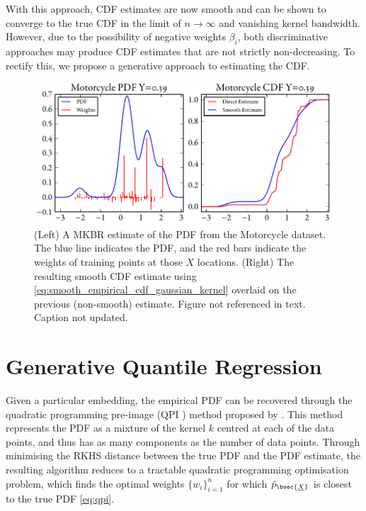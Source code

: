 \documentclass[twoside]{article} \usepackage{aistats2017}
\newcommand{\rv}[1]{\underline{#1}}
\newcommand{\warn}[1]{{\color{RedOrange} #1}}
\newcommand{\qpi}{QPI }
\begin{document}
		With this approach, CDF estimates are now smooth and can be shown to converge to the true CDF in the limit of $n \rightarrow \infty$ and vanishing kernel bandwidth. However, due to the possibility of negative weights $\beta_{i}$, both discriminative approaches may produce CDF estimates that are not strictly non-decreasing. To rectify this, we propose a generative approach to estimating the CDF.

		\begin{figure}
			\begin{center}
				\includegraphics[width=\columnwidth]{figures/cumulativeexamplesmooth}
			\end{center}
			\caption{\small (Left) A MKBR estimate of the PDF from the Motorcycle dataset. The blue line indicates the PDF, and the red bars indicate the weights of training points at those $X$ locations. (Right) The resulting smooth CDF estimate using \eqref{eq:smooth_empirical_cdf_gaussian_kernel} overlaid on the previous (non-smooth) estimate. \warn{Figure not referenced in text. Caption not updated.}}
			\label{fig:cumulativeexamplesmooth}
		\end{figure}

\section{Generative Quantile Regression}

	
	Given a particular embedding, the empirical PDF can be recovered through the quadratic programming pre-image (\qpi) method proposed by \cite{McCalman2013}. This method represents the PDF as a mixture of the kernel $k$ centred at each of the data points, and thus has as many components as the number of data points. Through minimising the RKHS distance between the true PDF and the PDF estimate, the resulting algorithm reduces to a tractable quadratic programming optimisation problem, which finds the optimal weights $\{w_{i}\}_{i = 1}^{n}$ for which $\hat{p}_{\bvec{\rv{X}}}$ is closest to the true PDF \eqref{eq:qpi}. 
	
\end{document}
